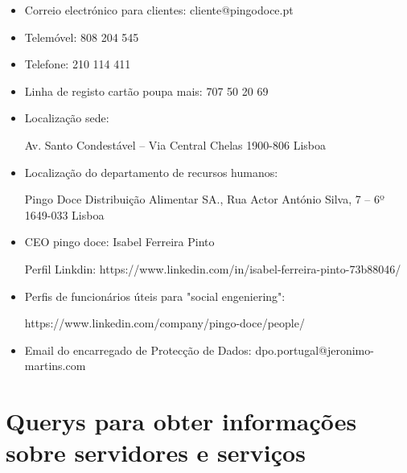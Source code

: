 \begin{itemize}
\item Correio electrónico para clientes: cliente@pingodoce.pt\newline


\item Telemóvel: 808 204 545 \newline


\item Telefone:  210 114 411\newline


\item Linha de registo cartão poupa mais: 707 50 20 69\newline

\item Localização sede:\newline


\par Av. Santo Condestável – Via Central Chelas 1900-806 Lisboa\newline


\item Localização do departamento de recursos humanos: \newline


\par Pingo Doce Distribuição Alimentar SA., Rua Actor António Silva, 7 – 6º 1649-033 Lisboa \newline

\item CEO pingo doce: Isabel Ferreira Pinto\newline

\par Perfil Linkdin: https://www.linkedin.com/in/isabel-ferreira-pinto-73b88046/\newline

\item Perfis de funcionários úteis para "social engeniering":\newline

\par https://www.linkedin.com/company/pingo-doce/people/\newline

\item Email do encarregado de Protecção de Dados:  dpo.portugal@jeronimo-martins.com \newline
\end{itemize}


\section{Querys para obter informações sobre servidores e serviços}


